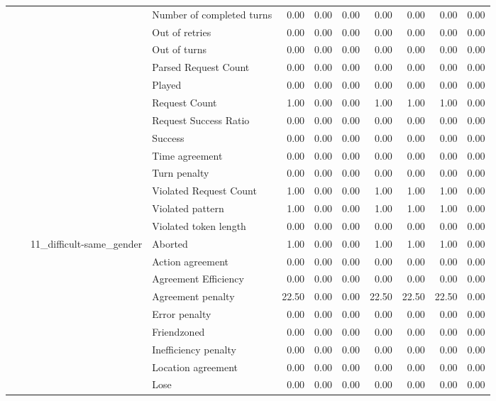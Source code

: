 \begin{tabular}{llllrrrrrrr}
 &  &  & Number of completed turns & 0.00 & 0.00 & 0.00 & 0.00 & 0.00 & 0.00 & 0.00 \\
 &  &  & Out of retries & 0.00 & 0.00 & 0.00 & 0.00 & 0.00 & 0.00 & 0.00 \\
 &  &  & Out of turns & 0.00 & 0.00 & 0.00 & 0.00 & 0.00 & 0.00 & 0.00 \\
 &  &  & Parsed Request Count & 0.00 & 0.00 & 0.00 & 0.00 & 0.00 & 0.00 & 0.00 \\
 &  &  & Played & 0.00 & 0.00 & 0.00 & 0.00 & 0.00 & 0.00 & 0.00 \\
 &  &  & Request Count & 1.00 & 0.00 & 0.00 & 1.00 & 1.00 & 1.00 & 0.00 \\
 &  &  & Request Success Ratio & 0.00 & 0.00 & 0.00 & 0.00 & 0.00 & 0.00 & 0.00 \\
 &  &  & Success & 0.00 & 0.00 & 0.00 & 0.00 & 0.00 & 0.00 & 0.00 \\
 &  &  & Time agreement & 0.00 & 0.00 & 0.00 & 0.00 & 0.00 & 0.00 & 0.00 \\
 &  &  & Turn penalty & 0.00 & 0.00 & 0.00 & 0.00 & 0.00 & 0.00 & 0.00 \\
 &  &  & Violated Request Count & 1.00 & 0.00 & 0.00 & 1.00 & 1.00 & 1.00 & 0.00 \\
 &  &  & Violated pattern & 1.00 & 0.00 & 0.00 & 1.00 & 1.00 & 1.00 & 0.00 \\
 &  &  & Violated token length & 0.00 & 0.00 & 0.00 & 0.00 & 0.00 & 0.00 & 0.00 \\
\cline{3-11}
 &  & \multirow[t]{27}{*}{11_difficult-same_gender} & Aborted & 1.00 & 0.00 & 0.00 & 1.00 & 1.00 & 1.00 & 0.00 \\
 &  &  & Action agreement & 0.00 & 0.00 & 0.00 & 0.00 & 0.00 & 0.00 & 0.00 \\
 &  &  & Agreement Efficiency & 0.00 & 0.00 & 0.00 & 0.00 & 0.00 & 0.00 & 0.00 \\
 &  &  & Agreement penalty & 22.50 & 0.00 & 0.00 & 22.50 & 22.50 & 22.50 & 0.00 \\
 &  &  & Error penalty & 0.00 & 0.00 & 0.00 & 0.00 & 0.00 & 0.00 & 0.00 \\
 &  &  & Friendzoned & 0.00 & 0.00 & 0.00 & 0.00 & 0.00 & 0.00 & 0.00 \\
 &  &  & Inefficiency penalty & 0.00 & 0.00 & 0.00 & 0.00 & 0.00 & 0.00 & 0.00 \\
 &  &  & Location agreement & 0.00 & 0.00 & 0.00 & 0.00 & 0.00 & 0.00 & 0.00 \\
 &  &  & Lose & 0.00 & 0.00 & 0.00 & 0.00 & 0.00 & 0.00 & 0.00 \\

\end{tabular}
